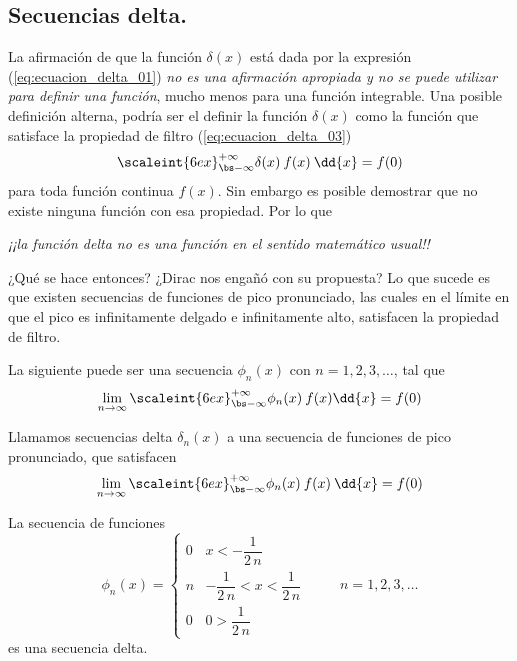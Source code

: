 \subsection{Secuencias delta.}\label{secuencias_delta}

La afirmación de que la función $\delta (x)$ está dada por la expresión (\ref{eq:ecuacion_delta_01}) \textit{no es una afirmación apropiada y no se puede utilizar para definir una función}, mucho menos para una función integrable. Una posible definición alterna, podría ser el definir la función $\delta (x)$ como la función que satisface la propiedad de filtro (\ref{eq:ecuacion_delta_03})
\begin{align*}
\scaleint{6ex}_{\bs -\infty}^{+ \infty} \delta (x) \: f (x) \: \dd{x} = f (0)
\end{align*}
para toda función continua $f (x)$. Sin embargo es posible demostrar que no existe ninguna función con esa propiedad. Por lo que 
\begin{center}
\textit{¡¡la función delta no es una función en el sentido matemático usual!!}
\end{center}
¿Qué se hace entonces?  ¿Dirac nos engañó con su propuesta? Lo que sucede es que existen secuencias de funciones de pico pronunciado, las cuales en el límite en que el pico es infinitamente delgado e infinitamente alto, satisfacen la propiedad de filtro.
\par
La siguiente puede ser una secuencia $\phi_{n} (x)$ con $n = 1, 2, 3, \ldots$, tal que
\begin{align*}
\lim_{n \to \infty} \scaleint{6ex}_{\bs -\infty}^{+ \infty} \phi_{n} (x) \: f (x) \dd{x} =  f (0)
\end{align*}
\begin{defi}
Llamamos secuencias delta $\delta_{n} (x)$ a una secuencia de funciones de pico pronunciado, que satisfacen
\begin{align*}
\lim_{n \to \infty} \scaleint{6ex}_{\bs -\infty}^{+ \infty} \phi_{n} (x) \: f (x) \: \dd{x} =  f (0)
\end{align*}
\end{defi}
\begin{ejemplo}
La secuencia de funciones
\begin{equation}
\phi_{n} (x) = \begin{cases}
0 & x < - \dfrac{1}{2 \, n} \\
n & - \dfrac{1}{2 \, n} < x < \dfrac{1}{2 \, n} \\
0 & 0 >  \dfrac{1}{2 \, n}
\end{cases}
\hspace{1cm} n = 1, 2, 3, \ldots
\label{eq:ecuacion_delta_04}
\end{equation}
es una secuencia delta.
\end{ejemplo}
